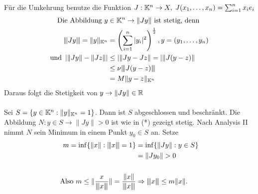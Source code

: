 \begin{beweis}
	Für die Umkehrung benutze die Funktion $J: \MdK^{n} \rightarrow X, \hspace{0.1cm} J(x_{1}, \dotsc, x_{n}) = \sum_{i = 1}^{n} x_{i} e_{i} $ \\
	\begin{align*}
 	 \text{Die Abbildung } y & \in \MdK^{n}  \rightarrow \| Jy \| \text{ ist stetig, denn} \\
 	 	 \vertiii{ Jy } = \| y \|_{\MdK^{n}} & = \left( \sum_{i = 1}^{n} |y_{i}|^{2} \right)^{\frac{1}{2}}, y = (y_{1}, \dotsc, y_{n}) \\
 	 	 \text{und } \left| \| Jy \| - \| Jz \| \right| & \leq | \| Jy - Jz \| = | \| J(y - z) \| \\
 	 	 & \leq \nu \vertiii{ J (y - z) } \\
 	 	 & = M \| y - z \|_{\MdK^{n}} \\
 	 \end{align*}
 Daraus folgt die Stetigkeit von $ y \rightarrow \| Jy \| \in \MdR $ \\ \\
	Sei $S = \{y \in \MdK^{n}: \| y \|_{\MdK^n} = 1 \}$. Dann ist $S$ abgeschlossen und beschränkt.
	Die Abbildung $N : y \in S \rightarrow \| Jy \| > 0$ ist wie in (*) gezeigt stetig. Nach Analysis II nimmt $N$ sein Minimum in einem Punkt $y_{0} \in S$ an. Setze
		\begin{align*}
			m = \inf\{\| x \| : \vertiii{ x } = 1\} & = \inf \{ \| Jy \|: y \in S \} \\
												& = \| J y_{0} \| > 0 \\ \\
			\text{Also } m \leq \| \frac{x}{ \vertiii{ x } } \| =  \frac{ \| x \| }{ \vertiii{ x } }  &\Rightarrow \vertiii{ x } \leq m \| x \|.
		\end{align*}
\end{beweis}

